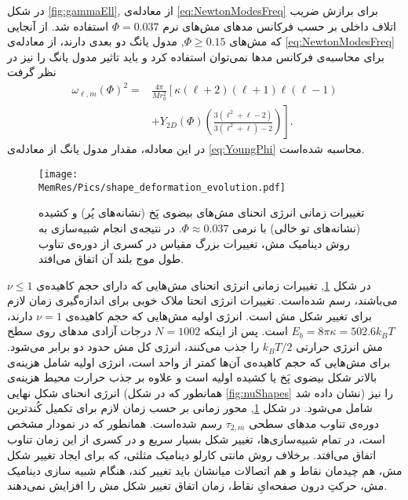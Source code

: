 در شکل 
\ref{fig:gammaEll},
از معادله‌ی
\ref{eq:NewtonModesFreq}
برای برازش ضریب اتلاف داخلی بر حسب فرکانس مد‌های مش‌های نرم
$\Phi=0.037$
استفاده شد. از آنجایی که مش‌های 
$\Phi\geq0.15$,
مدول یانگ دو بعدی دارند، از معادله‌ی 
\ref{eq:NewtonModesFreq}
برای محاسبه‌ی فرکانس مد‌ها نمی‌توان استفاده کرد و باید تاثیر مدول یانگ را نیز در نظر گرفت
\begin{equation}
\begin{aligned}
\omega_{\ell,m}(\Phi)^2=&\frac{4\pi}{Mr_0^2}\left[\kappa(\ell+2)(\ell+1)\ell(\ell-1)\right.\\
&\left.+Y_{2D}(\Phi)\left(\frac{3(\ell^2+\ell-2)}{3(\ell^2+\ell)-2}\right)\right].
\end{aligned}
\label{eq:YoungFreq}
\end{equation}
در این معادله، مقدار مدول یانگ از معادله‌ی
\ref{eq:YoungPhi}
محاسبه شده‌است.



\begin{figure}[h]
\begin{center}
\texttt{[image: \\MemRes/Pics/shape\_deformation\_evolution.pdf]}
\caption{
تغییرات زمانی انرژی انحنای مش‌های بیضوی‌ پَخ (نشانه‌های پُر) و کشیده (نشانه‌های تو خالی) با نرمی
$\Phi\approx0.037$. 
در نتیجه‌ی انجام شبیه‌سازی به روش دینامیک مش، تغییرات بزرگ مقیاس در کسری از دوره‌ی تناوب طول موج بلند آن اتفاق می‌افتد.
}
\label{fig:deformationEvo}
\end{center}
\end{figure}

در شکل
\ref{fig:deformationEvo},
تغییرات زمانی انرژی انحنای مش‌هایی که دارای حجم کاهیده‌ی 
$\nu\le1$
می‌باشند، رسم شده‌است. تغییرات انرژی انحنا ملاک خوبی برای اندازه‌گیری زمان لازم برای تغییر شکل مش است. انرژی اولیه مش‌هایی که حجم کاهیده‌ی
$\nu=1$
دارند،
$E_b=8\pi\kappa = 502.6 k_BT$
است. پس از اینکه 
$N=1002$
درجات آزادی مد‌های روی سطح مش انرژی حرارتی
$k_BT/2$
را جذب می‌کنند، انرژی کل مش حدود دو برابر می‌شود. برای مش‌هایی که حجم کاهیده‌ی آن‌ها کمتر از واحد است، انرژی اولیه شامل هزینه‌ی بالاتر شکل بیضوی پَخ یا کشیده اولیه است و علاوه بر جذب حرارت محیط هزینه‌ی انرژی انحنای شکل نهایی (همانطور که در شکل
\ref{fig:nuShapes}
نشان داده شد) را نیز شامل می‌شود. در شکل 
\ref{fig:deformationEvo},
محور زمانی بر حسب زمان لازم برای تکمیل کُندترین دوره‌ی تناوب مد‌های سطحی 
$\tau_{2,m}$
رسم شده‌است. همانطور که در نمودار مشخص است، در تمام شبیه‌سازی‌ها، تغییر شکل بسیار سریع و در کسری از این زمان تناوب اتفاق می‌افتد. برخلاف روش‌ مانتی کارلو دینامیک مثلثی، که برای ایجاد تغییر شکل مش، هم چیدمان نقاط و هم اتصالات میانشان باید تغییر کند، هنگام شبیه سازی دینامیک مش، حرکتِ درون صفحه‌ایِ نقاط، زمان اتفاق  تغییر شکل مش را افزایش نمی‌دهند.


















